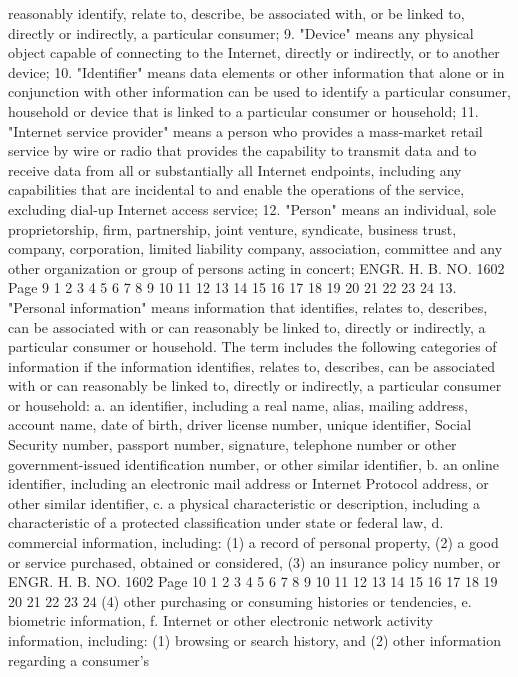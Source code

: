 reasonably identify, relate to, describe, be associated with, or be
linked to, directly or indirectly, a particular consumer;
9. "Device" means any physical object capable of connecting to
the Internet, directly or indirectly, or to another device;
10. "Identifier" means data elements or other information that
alone or in conjunction with other information can be used to
identify a particular consumer, household or device that is linked
to a particular consumer or household;
11. "Internet service provider" means a person who provides a
mass-market retail service by wire or radio that provides the
capability to transmit data and to receive data from all or
substantially all Internet endpoints, including any capabilities
that are incidental to and enable the operations of the service,
excluding dial-up Internet access service;
12. "Person" means an individual, sole proprietorship, firm,
partnership, joint venture, syndicate, business trust, company,
corporation, limited liability company, association, committee and
any other organization or group of persons acting in concert;
ENGR. H. B. NO. 1602 Page 9
1
2
3
4
5
6
7
8
9
10
11
12
13
14
15
16
17
18
19
20
21
22
23
24
13. "Personal information" means information that identifies,
relates to, describes, can be associated with or can reasonably be
linked to, directly or indirectly, a particular consumer or
household. The term includes the following categories of
information if the information identifies, relates to, describes,
can be associated with or can reasonably be linked to, directly or
indirectly, a particular consumer or household:
a. an identifier, including a real name, alias, mailing
address, account name, date of birth, driver license
number, unique identifier, Social Security number,
passport number, signature, telephone number or other
government-issued identification number, or other
similar identifier,
b. an online identifier, including an electronic mail
address or Internet Protocol address, or other similar
identifier,
c. a physical characteristic or description, including a
characteristic of a protected classification under
state or federal law,
d. commercial information, including:
(1) a record of personal property,
(2) a good or service purchased, obtained or
considered,
(3) an insurance policy number, or
ENGR. H. B. NO. 1602 Page 10
1
2
3
4
5
6
7
8
9
10
11
12
13
14
15
16
17
18
19
20
21
22
23
24
(4) other purchasing or consuming histories or
tendencies,
e. biometric information,
f. Internet or other electronic network activity
information, including:
(1) browsing or search history, and
(2) other information regarding a consumer's
